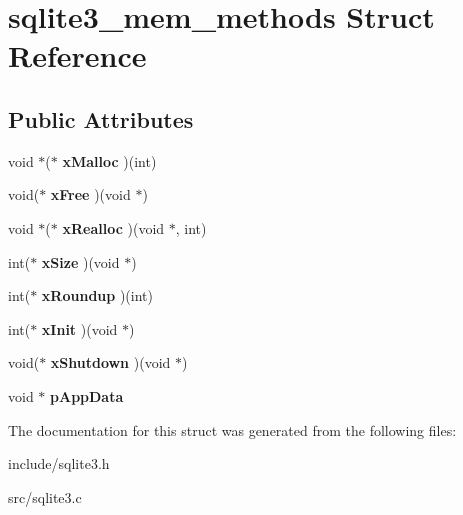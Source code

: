 \hypertarget{structsqlite3__mem__methods}{\section{sqlite3\-\_\-mem\-\_\-methods Struct Reference}
\label{structsqlite3__mem__methods}
}
\subsection*{Public Attributes}
\begin{DoxyCompactItemize}
\item 
\hypertarget{structsqlite3__mem__methods_acb9151cf501c851b61ab6b378832b159}{void $\ast$($\ast$ {\bfseries x\-Malloc} )(int)}\label{structsqlite3__mem__methods_acb9151cf501c851b61ab6b378832b159}

\item 
\hypertarget{structsqlite3__mem__methods_aa2e7fe8d030adaa17fd23a44fec1eca1}{void($\ast$ {\bfseries x\-Free} )(void $\ast$)}\label{structsqlite3__mem__methods_aa2e7fe8d030adaa17fd23a44fec1eca1}

\item 
\hypertarget{structsqlite3__mem__methods_a5bb7e62164d0934888473c618c61dc77}{void $\ast$($\ast$ {\bfseries x\-Realloc} )(void $\ast$, int)}\label{structsqlite3__mem__methods_a5bb7e62164d0934888473c618c61dc77}

\item 
\hypertarget{structsqlite3__mem__methods_a6c68275b577d66ae659ef30344c8f86c}{int($\ast$ {\bfseries x\-Size} )(void $\ast$)}\label{structsqlite3__mem__methods_a6c68275b577d66ae659ef30344c8f86c}

\item 
\hypertarget{structsqlite3__mem__methods_a8b3f0d1ddeb498c4aaf9bbce5b92a268}{int($\ast$ {\bfseries x\-Roundup} )(int)}\label{structsqlite3__mem__methods_a8b3f0d1ddeb498c4aaf9bbce5b92a268}

\item 
\hypertarget{structsqlite3__mem__methods_ad0997b548928358d655000b6ac825cf4}{int($\ast$ {\bfseries x\-Init} )(void $\ast$)}\label{structsqlite3__mem__methods_ad0997b548928358d655000b6ac825cf4}

\item 
\hypertarget{structsqlite3__mem__methods_a6f48100692bd935d7f3dbb8c701ab6ca}{void($\ast$ {\bfseries x\-Shutdown} )(void $\ast$)}\label{structsqlite3__mem__methods_a6f48100692bd935d7f3dbb8c701ab6ca}

\item 
\hypertarget{structsqlite3__mem__methods_af91b7adfa1f6aace0b129bac800bd444}{void $\ast$ {\bfseries p\-App\-Data}}\label{structsqlite3__mem__methods_af91b7adfa1f6aace0b129bac800bd444}

\end{DoxyCompactItemize}


The documentation for this struct was generated from the following files\-:\begin{DoxyCompactItemize}
\item 
include/sqlite3.\-h\item 
src/sqlite3.\-c\end{DoxyCompactItemize}
